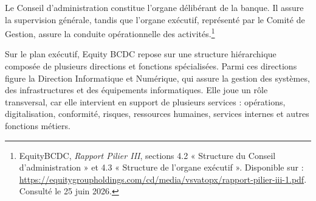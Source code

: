 \documentclass[12pt,a4paper]{report}
\begin{document}
Le Conseil d'administration constitue l'organe délibérant de la banque. Il assure la supervision générale, tandis que l'organe exécutif, représenté par le Comité de Gestion, assure la conduite opérationnelle des activités.\footnote{EquityBCDC, \textit{Rapport Pilier III}, sections
4.2 « Structure du Conseil d'administration » et 4.3 « Structure de l'organe exécutif ».
Disponible sur :
\url{https://equitygroupholdings.com/cd/media/vsvatopx/rapport-pilier-iii-1.pdf}.
Consulté le 25 juin 2026.}

Sur le plan exécutif, Equity BCDC repose sur une structure hiérarchique composée de plusieurs directions et fonctions spécialisées. 
Parmi ces directions figure la Direction Informatique et Numérique, qui assure la gestion des systèmes, des infrastructures et des équipements informatiques. Elle joue un rôle transversal, car elle intervient en support de plusieurs services : opérations, digitalisation, conformité, risques, ressources humaines, services internes et autres fonctions métiers.
\end{document}
